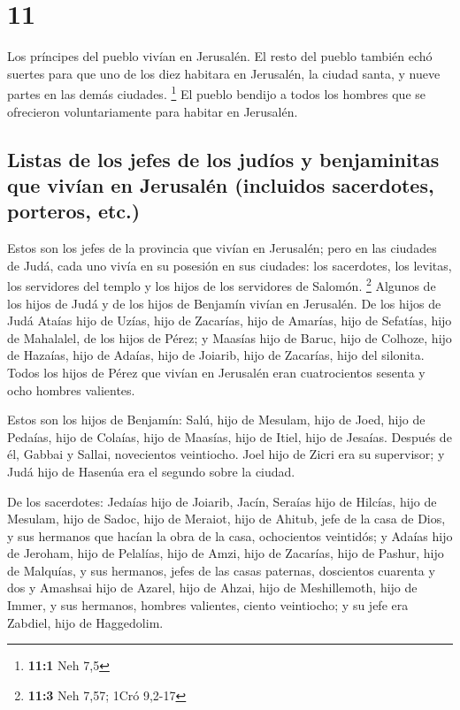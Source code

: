 \hypertarget{section-10}{%
\section{11}\label{section-10}}

 Los príncipes del pueblo vivían en Jerusalén. El resto
del pueblo también echó suertes para que uno de los diez habitara en
Jerusalén, la ciudad santa, y nueve partes en las demás ciudades.
\footnote{\textbf{11:1} Neh 7,5}  El pueblo bendijo a
todos los hombres que se ofrecieron voluntariamente para habitar en
Jerusalén.

\hypertarget{listas-de-los-jefes-de-los-juduxedos-y-benjaminitas-que-vivuxedan-en-jerusaluxe9n-incluidos-sacerdotes-porteros-etc.}{%
\subsection{Listas de los jefes de los judíos y benjaminitas que vivían
en Jerusalén (incluidos sacerdotes, porteros,
etc.)}\label{listas-de-los-jefes-de-los-juduxedos-y-benjaminitas-que-vivuxedan-en-jerusaluxe9n-incluidos-sacerdotes-porteros-etc.}}

 Estos son los jefes de la provincia que vivían en
Jerusalén; pero en las ciudades de Judá, cada uno vivía en su posesión
en sus ciudades: los sacerdotes, los levitas, los servidores del templo
y los hijos de los servidores de Salomón. \footnote{\textbf{11:3} Neh
  7,57; 1Cró 9,2-17}  Algunos de los hijos de Judá y de
los hijos de Benjamín vivían en Jerusalén. De los hijos de Judá Ataías
hijo de Uzías, hijo de Zacarías, hijo de Amarías, hijo de Sefatías, hijo
de Mahalalel, de los hijos de Pérez;  y Maasías hijo de
Baruc, hijo de Colhoze, hijo de Hazaías, hijo de Adaías, hijo de
Joiarib, hijo de Zacarías, hijo del silonita.  Todos los
hijos de Pérez que vivían en Jerusalén eran cuatrocientos sesenta y ocho
hombres valientes.

 Estos son los hijos de Benjamín: Salú, hijo de Mesulam,
hijo de Joed, hijo de Pedaías, hijo de Colaías, hijo de Maasías, hijo de
Itiel, hijo de Jesaías.  Después de él, Gabbai y Sallai,
novecientos veintiocho.  Joel hijo de Zicri era su
supervisor; y Judá hijo de Hasenúa era el segundo sobre la ciudad.

 De los sacerdotes: Jedaías hijo de Joiarib, Jacín,
 Seraías hijo de Hilcías, hijo de Mesulam, hijo de Sadoc,
hijo de Meraiot, hijo de Ahitub, jefe de la casa de Dios,
 y sus hermanos que hacían la obra de la casa,
ochocientos veintidós; y Adaías hijo de Jeroham, hijo de Pelalías, hijo
de Amzi, hijo de Zacarías, hijo de Pashur, hijo de Malquías,
 y sus hermanos, jefes de las casas paternas, doscientos
cuarenta y dos y Amashsai hijo de Azarel, hijo de Ahzai, hijo de
Meshillemoth, hijo de Immer,  y sus hermanos, hombres
valientes, ciento veintiocho; y su jefe era Zabdiel, hijo de Haggedolim.

